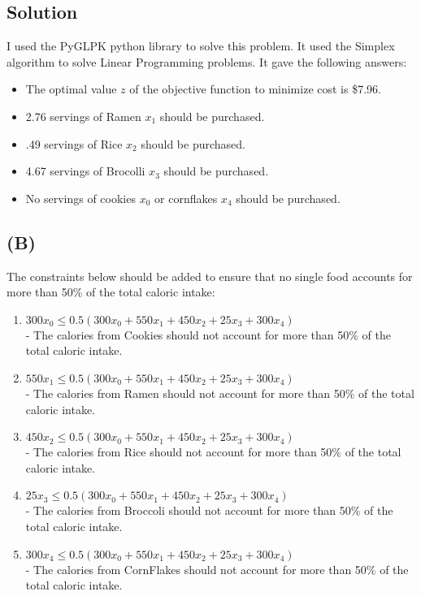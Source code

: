 \documentclass[12pt]{article}
\begin{document}
\subsection*{Solution}
I used the PyGLPK python library to solve this problem.  It used the Simplex algorithm to solve Linear Programming problems.  It gave the following answers:
\begin{itemize}
  \item The optimal value $z$ of the objective function to minimize cost is \$7.96.
  \item 2.76 servings of Ramen $x_{1}$ should be purchased.
  \item .49 servings of Rice $x_{2}$ should be purchased.
  \item 4.67 servings of Brocolli $x_{3}$ should be purchased.
  \item No servings of cookies $x_{0}$ or cornflakes $x_{4}$ should be purchased.
\end{itemize}

\subsection*{(B)}
The constraints below should be added to ensure that no single food accounts for more than 50\% of the total caloric intake:
\begin{enumerate}
\itemsep0em
  \item $300x_{0} \leq 0.5(300x_{0} + 550x_{1} + 450x_{2} + 25x_{3} + 300x_{4})$\\
  - The calories from Cookies should not account for more than 50\% of the total caloric intake. 
  \item $550x_{1} \leq 0.5(300x_{0} + 550x_{1} + 450x_{2} + 25x_{3} + 300x_{4})$\\
  - The calories from Ramen should not account for more than 50\% of the total caloric intake. 
  \item $450x_{2} \leq 0.5(300x_{0} + 550x_{1} + 450x_{2} + 25x_{3} + 300x_{4})$\\
  - The calories from Rice should not account for more than 50\% of the total caloric intake. 
  \item $25x_{3} \leq 0.5(300x_{0} + 550x_{1} + 450x_{2} + 25x_{3} + 300x_{4})$\\
  - The calories from Broccoli should not account for more than 50\% of the total caloric intake. 
  \item $300x_{4} \leq 0.5(300x_{0} + 550x_{1} + 450x_{2} + 25x_{3} + 300x_{4})$\\
  - The calories from CornFlakes should not account for more than 50\% of the total caloric intake.
\end{enumerate}
\end{document}
